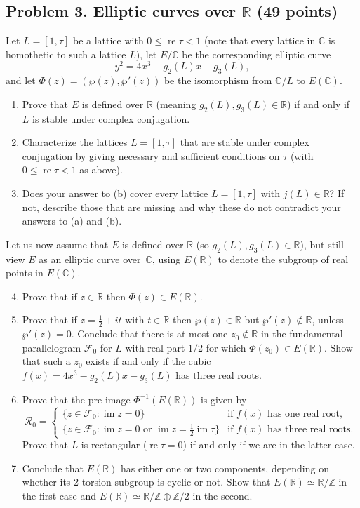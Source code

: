 \documentclass[11pt]{article}
\newcommand{\R}{\mathbb{R}}
\newcommand{\C}{\mathbb{C}}
\newcommand{\Z}{\mathbb{Z}}
\newcommand{\re}{\operatorname{re}}
\newcommand{\im}{\operatorname{im}}
\begin{document}
\subsection*{Problem  3.  Elliptic curves over $\boldsymbol{\R}$ (49 points)}
Let $L=[1,\tau]$ be a lattice with $0\le \re \tau < 1$ (note that every lattice in $\C$ is homothetic to such a lattice $L$), let $E/\C$ be the corresponding elliptic curve $$y^2=4x^3-g_2(L)x-g_3(L),$$
and let $\Phi(z)=(\wp(z),\wp'(z))$ be the isomorphism from $\C/L$ to $E(\C)$.

\begin{enumerate}[{\bf (a)}]
\item Prove that $E$ is defined over $\R$ (meaning $g_2(L),g_3(L)\in\R$) if and only if $L$ is stable under complex conjugation.

\item Characterize the lattices $L=[1,\tau]$ that are stable under complex conjugation by giving necessary and sufficient conditions on $\tau$ (with $0\le \re \tau < 1$ as above).

\item Does your answer to (b) cover every lattice $L=[1,\tau]$ with $j(L)\in \R$?
If not, describe those that are missing and why these do not contradict your answers to (a) and (b).
\end{enumerate}

Let us now assume that $E$ is defined over $\R$ (so $g_2(L),g_3(L)\in\R$), but still view $E$ as an elliptic curve over~$\C$, using $E(\R)$ to denote the subgroup of real points in $E(\C)$.

\begin{enumerate}[{\bf (a)}]
\setcounter{enumi}{3}
\item Prove that if $z\in\R$ then $\Phi(z)\in E(\R)$.
\item Prove that if $z=\frac{1}{2}+it$ with $t\in\R$ then $\wp(z)\in \R$ but $\wp'(z)\not\in \R$, unless $\wp'(z)=0$.
Conclude that there is at most one $z_0\not\in \R$ in the  fundamental parallelogram $\mathcal{F}_0$ for $L$ with real part $1/2$ for which $\Phi(z_0)\in E(\R)$.  Show that such a $z_0$ exists if and only if the cubic $f(x)=4x^3-g_2(L)x-g_3(L)$ has three real roots.
\item Prove that the pre-image $\Phi^{-1}(E(\R))$ is given by
\[
\mathcal{R}_0 =
\begin{cases}
\{z\in\mathcal{F}_0: \im z = 0\}&\text{if $f(x)$ has one real root},\\
\{z\in\mathcal{F}_0:\im z = 0 \text{ or }\im z= \frac{1}{2}\im \tau\}&\text{if $f(x)$ has three real roots}.
\end{cases}
\]
Prove that $L$ is rectangular ($\re \tau = 0$) if and only  if we are in the latter case.

\item Conclude that $E(\R)$ has either one or two components, depending on whether its 2-torsion subgroup is cyclic or not.
Show that $E(\R)\simeq \R/\Z$ in the first case and $E(\R)\simeq \R/\Z\oplus \Z/2$ in the second.
\end{enumerate}
\end{document}
